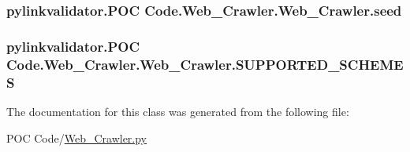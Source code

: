 \subsubsection[{seed}]{\setlength{\rightskip}{0pt plus 5cm}pylinkvalidator.\+P\+OC Code.\+Web\+\_\+\+Crawler.\+Web\+\_\+\+Crawler.\+seed}\hypertarget{classpylinkvalidator_1_1_p_o_c_01_code_1_1_web___crawler_1_1_web___crawler_a783243f26a2aa6c636626231ec137c35}{}\label{classpylinkvalidator_1_1_p_o_c_01_code_1_1_web___crawler_1_1_web___crawler_a783243f26a2aa6c636626231ec137c35}
\subsubsection[{S\+U\+P\+P\+O\+R\+T\+E\+D\+\_\+\+S\+C\+H\+E\+M\+ES}]{\setlength{\rightskip}{0pt plus 5cm}pylinkvalidator.\+P\+OC Code.\+Web\+\_\+\+Crawler.\+Web\+\_\+\+Crawler.\+S\+U\+P\+P\+O\+R\+T\+E\+D\+\_\+\+S\+C\+H\+E\+M\+ES}\hypertarget{classpylinkvalidator_1_1_p_o_c_01_code_1_1_web___crawler_1_1_web___crawler_a917f9b86adefbcb3dc0dc53075ebbd34}{}\label{classpylinkvalidator_1_1_p_o_c_01_code_1_1_web___crawler_1_1_web___crawler_a917f9b86adefbcb3dc0dc53075ebbd34}


The documentation for this class was generated from the following file\+:\begin{DoxyCompactItemize}
\item 
P\+O\+C Code/\hyperlink{_p_o_c_01_code_2_web___crawler_8py}{Web\+\_\+\+Crawler.\+py}\end{DoxyCompactItemize}
